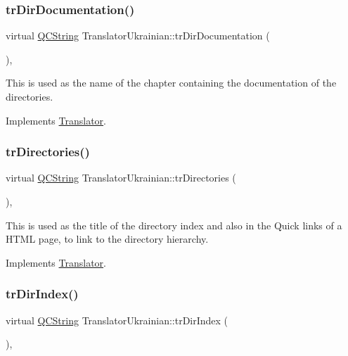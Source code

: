 \subsubsection{\texorpdfstring{trDirDocumentation()}{trDirDocumentation()}}
{\footnotesize\ttfamily virtual \mbox{\hyperlink{class_q_c_string}{Q\+C\+String}} Translator\+Ukrainian\+::tr\+Dir\+Documentation (\begin{DoxyParamCaption}{ }\end{DoxyParamCaption})\hspace{0.3cm}{\ttfamily [inline]}, {\ttfamily [virtual]}}

This is used as the name of the chapter containing the documentation of the directories. 

Implements \mbox{\hyperlink{class_translator}{Translator}}.

\mbox{\label{class_translator_ukrainian_ac75e514ec56fb37ee24ac8064128860a}} 
\subsubsection{\texorpdfstring{trDirectories()}{trDirectories()}}
{\footnotesize\ttfamily virtual \mbox{\hyperlink{class_q_c_string}{Q\+C\+String}} Translator\+Ukrainian\+::tr\+Directories (\begin{DoxyParamCaption}{ }\end{DoxyParamCaption})\hspace{0.3cm}{\ttfamily [inline]}, {\ttfamily [virtual]}}

This is used as the title of the directory index and also in the Quick links of a H\+T\+ML page, to link to the directory hierarchy. 

Implements \mbox{\hyperlink{class_translator}{Translator}}.

\mbox{\label{class_translator_ukrainian_aef569512f61552361990065648b15d10}} 
\subsubsection{\texorpdfstring{trDirIndex()}{trDirIndex()}}
{\footnotesize\ttfamily virtual \mbox{\hyperlink{class_q_c_string}{Q\+C\+String}} Translator\+Ukrainian\+::tr\+Dir\+Index (\begin{DoxyParamCaption}{ }\end{DoxyParamCaption})\hspace{0.3cm}{\ttfamily [inline]}, {\ttfamily [virtual]}}

